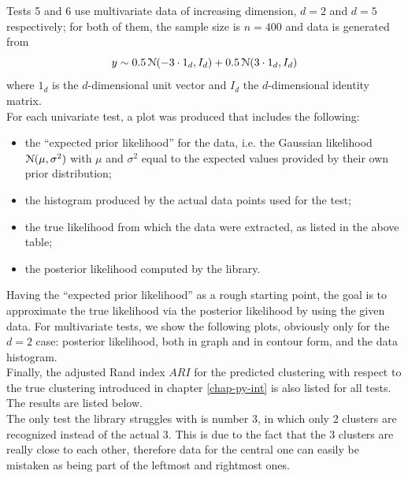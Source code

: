 Tests 5 and 6 use multivariate data of increasing dimension, $d = 2$ and $d=5$ respectively; for both of them, the sample size is $n=400$ and data is generated from
$$y \sim 0.5 \, \mathcal N(-3 \cdot 1_d, I_d) + 0.5 \, \mathcal N(3 \cdot 1_d, I_d)$$
where $1_d$ is the $d$-dimensional unit vector and $I_d$ the $d$-dimensional identity matrix. \\
For each univariate test, a plot was produced that includes the following:
\begin{itemize}
	\item the ``expected prior likelihood'' for the data, i.e. the Gaussian likelihood $\mathcal N(\mu,\sigma^2)$ with $\mu$ and $\sigma^2$ equal to the expected values provided by their own prior distribution;
	\item the histogram produced by the actual data points used for the test;
	\item the true likelihood from which the data were extracted, as listed in the above table;
	\item the posterior likelihood computed by the library.
\end{itemize}
Having the ``expected prior likelihood'' as a rough starting point, the goal is to approximate the true likelihood via the posterior likelihood by using the given data.
For multivariate tests, we show the following plots, obviously only for the $d=2$ case: posterior likelihood, both in graph and in contour form, and the data histogram. \\
Finally, the adjusted Rand index $ARI$ for the predicted clustering with respect to the true clustering introduced in chapter \ref{chap-py-int} is also listed for all tests.
The results are listed below. \\
The only test the library struggles with is number 3, in which only 2 clusters are recognized instead of the actual 3.
This is due to the fact that the 3 clusters are really close to each other, therefore data for the central one can easily be mistaken as being part of the leftmost and rightmost ones.
